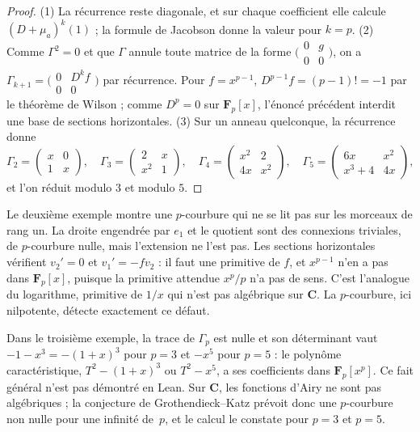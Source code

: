 \begin{proof}
(1) La récurrence reste diagonale, et sur chaque coefficient elle calcule $(D + \mu_a)^k(1)$ ; la formule de Jacobson donne la valeur pour $k = p$. (2) Comme $\Gamma^2 = 0$ et que $\Gamma$ annule toute matrice de la forme $\bigl(\begin{smallmatrix} 0 & g \\ 0 & 0 \end{smallmatrix}\bigr)$, on a $\Gamma_{k+1} = \bigl(\begin{smallmatrix} 0 & D^k f \\ 0 & 0 \end{smallmatrix}\bigr)$ par récurrence. Pour $f = x^{p-1}$, $D^{p-1} f = (p-1)! = -1$ par le théorème de Wilson ; comme $D^p = 0$ sur $\mathbf F_p[x]$, l'énoncé précédent interdit une base de sections horizontales. (3) Sur un anneau quelconque, la récurrence donne
\[
\Gamma_2 = \begin{pmatrix} x & 0 \\ 1 & x \end{pmatrix}, \quad
\Gamma_3 = \begin{pmatrix} 2 & x \\ x^2 & 1 \end{pmatrix}, \quad
\Gamma_4 = \begin{pmatrix} x^2 & 2 \\ 4x & x^2 \end{pmatrix}, \quad
\Gamma_5 = \begin{pmatrix} 6x & x^2 \\ x^3 + 4 & 4x \end{pmatrix},
\]
et l'on réduit modulo $3$ et modulo $5$.
\end{proof}

Le deuxième exemple montre une $p$-courbure qui ne se lit pas sur les morceaux de rang un. La droite engendrée par $e_1$ et le quotient sont des connexions triviales, de $p$-courbure nulle, mais l'extension ne l'est pas. Les sections horizontales vérifient $v_2' = 0$ et $v_1' = -f v_2$ : il faut une primitive de $f$, et $x^{p-1}$ n'en a pas dans $\mathbf F_p[x]$, puisque la primitive attendue $x^p/p$ n'a pas de sens. C'est l'analogue du logarithme, primitive de $1/x$ qui n'est pas algébrique sur $\mathbf C$. La $p$-courbure, ici nilpotente, détecte exactement ce défaut.

Dans le troisième exemple, la trace de $\Gamma_p$ est nulle et son déterminant vaut $-1 - x^3 = -(1 + x)^3$ pour $p = 3$ et $-x^5$ pour $p = 5$ : le polynôme caractéristique, $T^2 - (1+x)^3$ ou $T^2 - x^5$, a ses coefficients dans $\mathbf F_p[x^p]$. Ce fait général n'est pas démontré en Lean. Sur $\mathbf C$, les fonctions d'Airy ne sont pas algébriques ; la conjecture de Grothendieck--Katz prévoit donc une $p$-courbure non nulle pour une infinité de~$p$, et le calcul le constate pour $p = 3$ et $p = 5$.

